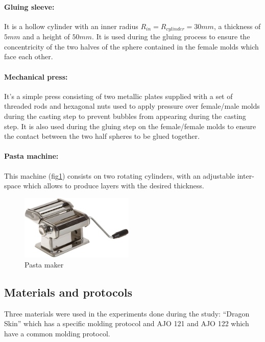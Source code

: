 \paragraph{Gluing sleeve:}
It is a hollow cylinder with an inner radius $R_{in} = R_{cylinder} = 30 mm$, a thickness of $5 mm$ and a height of $50 mm$. It is used during the gluing process to ensure the concentricity of the two halves of the sphere contained in the female molds which face each other.

\paragraph{Mechanical press:}
It's a simple press consisting of two metallic plates supplied with a set of threaded rods and hexagonal nuts used to apply pressure over female/male molds during the casting step to prevent bubbles from appearing during the casting step. It is also used during the gluing step on the female/female molds to ensure the contact between the two half spheres to be glued together.

\paragraph{Pasta machine:}
This machine (fig\ref{fig:pasta_maker}) consists on two rotating cylinders, with an adjustable inter-space which allows to produce layers with the desired thickness.
\begin{figure}[H] %
	\centering%
  \includegraphics[width=0.48\textwidth]{figures/Chapter_1/rolling_machine.png}
	\caption{Pasta maker}
	\label{fig:pasta_maker}
\end{figure}

\newpage
\subsection{Materials and protocols}
Three materials were used in the experiments done during the study: "`Dragon Skin"' which has a specific molding protocol and AJO 121 and AJO 122 which have a common molding protocol.

